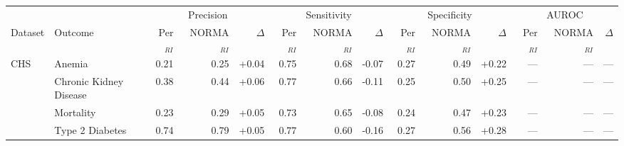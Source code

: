 \begin{table}[ht]
\centering
\footnotesize
\begin{tabular}{llrrrrrrrrrrrr}
\toprule
 &  & \multicolumn{3}{c}{Precision} & \multicolumn{3}{c}{Sensitivity} & \multicolumn{3}{c}{Specificity} & \multicolumn{3}{c}{AUROC} \\
\cmidrule(lr){3-5} \cmidrule(lr){6-8} \cmidrule(lr){9-11} \cmidrule(lr){12-14}
Dataset & Outcome & Per$_{RI}$ & NORMA$_{RI}$ & $\Delta$ & Per$_{RI}$ & NORMA$_{RI}$ & $\Delta$ & Per$_{RI}$ & NORMA$_{RI}$ & $\Delta$ & Per$_{RI}$ & NORMA$_{RI}$ & $\Delta$ \\
\midrule
CHS & Anemia & 0.21 & 0.25 & +0.04 & 0.75 & 0.68 & -0.07 & 0.27 & 0.49 & +0.22 & --- & --- & --- \\
 & Chronic Kidney Disease & 0.38 & 0.44 & +0.06 & 0.77 & 0.66 & -0.11 & 0.25 & 0.50 & +0.25 & --- & --- & --- \\
 & Mortality & 0.23 & 0.29 & +0.05 & 0.73 & 0.65 & -0.08 & 0.24 & 0.47 & +0.23 & --- & --- & --- \\
 & Type 2 Diabetes & 0.74 & 0.79 & +0.05 & 0.77 & 0.60 & -0.16 & 0.27 & 0.56 & +0.28 & --- & --- & --- \\
\bottomrule
\end{tabular}
\label{tab:12_eval}
\end{table}